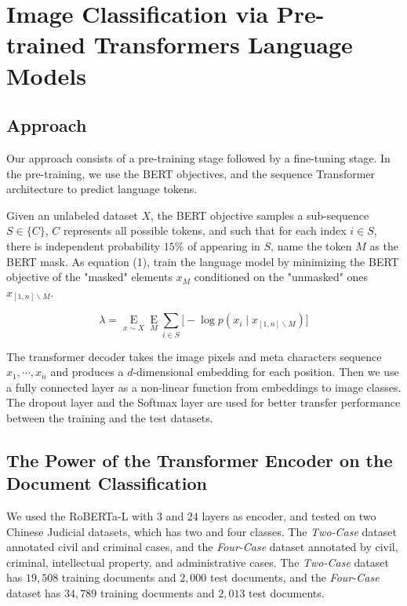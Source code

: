\documentclass[runningheads]{llncs}
\begin{document}
\section{Image Classification via Pre-trained Transformers Language Models}

\subsection{Approach}

Our approach consists of a pre-training stage followed by a fine-tuning stage.
In the pre-training, we use the BERT objectives, and the sequence Transformer architecture to predict language tokens.

\par Given an unlabeled dataset $ X$, the BERT objective samples a sub-sequence $ S \in \{C\}$,
$C$ represents all possible tokens, and such that for each index $i \in  S$,
there is independent probability $15\%$ of appearing in $ S$,
name the token $M$ as the BERT mask.
As equation (1), train the language model by minimizing the BERT objective of the "masked" elements $x_M$
conditioned on the "unmasked" ones $x_{\left[1,n\right]\backslash M}$.

\begin{equation}
  \lambda = \mathop{ E}\limits_{x\sim X} \mathop{ E}\limits_{M} \sum_{i\in S}{\bigl[-\log{p(x_i\mid x_{\left[1,n \right]\backslash M})\bigr]}}
\end{equation}

\par The transformer decoder takes the image pixels and meta characters sequence $x_1,\cdots,x_n$ and produces a $d$-dimensional
embedding for each position.
Then we use a fully connected layer as a non-linear function from embeddings to image classes.
The dropout layer and the Softmax layer are used for better transfer performance between the training and the test datasets.

\subsection{The Power of the Transformer Encoder on the Document Classification}

We used the RoBERTa-L with 3 and 24 layers as encoder, and tested on two Chinese Judicial datasets, which has two and four classes.
The \textit{Two-Case} dataset annotated civil and criminal cases, and the \textit{Four-Case} dataset annotated by civil, criminal, intellectual property, and administrative cases.
The \textit{Two-Case} dataset has $19,508$ training documents and $2,000$ test documents, and the \textit{Four-Case} dataset has $34,789$ training documents and $2,013$ test documents.
\end{document}

